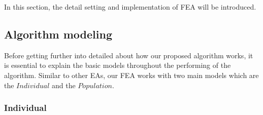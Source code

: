 \documentclass[final]{elsarticle}
\begin{document}
In this section, the detail setting and implementation of FEA will be introduced.

\subsection{Algorithm modeling}

Before getting further into detailed about how our proposed algorithm works, it is essential to explain the basic models throughout the performing of the algorithm. Similar to other EAs, our FEA works with two main models which are the $ Individual $ and the $ Population $.

\subsubsection{Individual}
\end{document}
